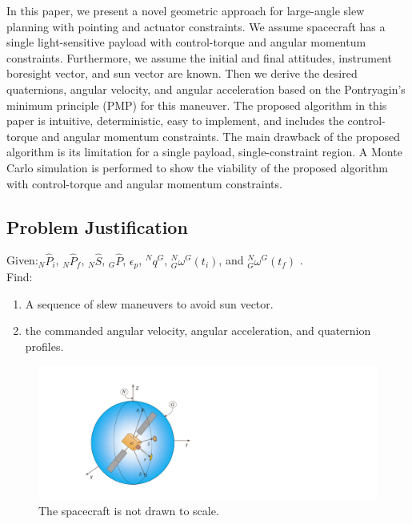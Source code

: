 \documentclass[letterpaper, preprint, paper,11pt]{AAS}	%
\begin{document}
In this paper, we present a novel geometric approach for large-angle slew planning with pointing and actuator constraints.  We assume spacecraft has a single light-sensitive payload with control-torque and angular momentum constraints. Furthermore, we assume the initial and final attitudes, instrument boresight vector, and sun vector are known. Then we derive the desired quaternions, angular velocity, and angular acceleration based on the Pontryagin's minimum principle (PMP) for this maneuver. The proposed algorithm in this paper is intuitive, deterministic, easy to implement, and includes the control-torque and angular momentum constraints. The main drawback of the proposed algorithm is its limitation for a single payload, single-constraint region.  A Monte Carlo simulation is performed to show the viability of the proposed algorithm with control-torque and angular momentum constraints. 


	\subsection{Problem Justification}
	
		Given:$_N\hat{P}_i$, $_N\hat{P}_f$, $_N\hat{S}$, $_G\hat{P}$, $\epsilon_p$, $^Nq^G$, $^N_G\omega^G(t_i)$, and $^N_G\omega^G(t_f)$ .\\
		
		Find: 
		\begin{enumerate}
			\item A sequence of slew maneuvers to avoid sun vector.
			\item the commanded angular velocity, angular acceleration, and quaternion profiles.
		\end{enumerate} 
		\begin{figure}[htb]
			\begin{center}
			\includegraphics[width=6in]{./Figures/SAS_Schematic}
			\caption{The spacecraft is not drawn to scale.}
			\end{center}
		\end{figure}
	
\end{document}
